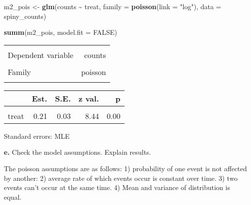 \documentclass[
]{article}
\newenvironment{Shaded}{\begin{snugshade}}{\end{snugshade}}
\newcommand{\AttributeTok}[1]{\textcolor[rgb]{0.13,0.29,0.53}{#1}}
\newcommand{\ConstantTok}[1]{\textcolor[rgb]{0.56,0.35,0.01}{#1}}
\newcommand{\FunctionTok}[1]{\textcolor[rgb]{0.13,0.29,0.53}{\textbf{#1}}}
\newcommand{\NormalTok}[1]{#1}
\newcommand{\OtherTok}[1]{\textcolor[rgb]{0.56,0.35,0.01}{#1}}
\newcommand{\SpecialCharTok}[1]{\textcolor[rgb]{0.81,0.36,0.00}{\textbf{#1}}}
\newcommand{\StringTok}[1]{\textcolor[rgb]{0.31,0.60,0.02}{#1}}
\begin{document}
\begin{Shaded}
\begin{Highlighting}[]
\NormalTok{m2\_pois }\OtherTok{\textless{}{-}} \FunctionTok{glm}\NormalTok{(counts }\SpecialCharTok{\textasciitilde{}}\NormalTok{ treat,}
               \AttributeTok{family =} \FunctionTok{poisson}\NormalTok{(}\AttributeTok{link =} \StringTok{"log"}\NormalTok{),}
               \AttributeTok{data =}\NormalTok{ spiny\_counts)}

\FunctionTok{summ}\NormalTok{(m2\_pois, }\AttributeTok{model.fit =} \ConstantTok{FALSE}\NormalTok{)}
\end{Highlighting}
\end{Shaded}

\begin{table}[!h]
\centering
\begin{tabular}{lr}
\toprule
\cellcolor{gray!10}{Observations} & \cellcolor{gray!10}{252}\\
Dependent variable & counts\\
\cellcolor{gray!10}{Type} & \cellcolor{gray!10}{Generalized linear model}\\
Family & poisson\\
\cellcolor{gray!10}{Link} & \cellcolor{gray!10}{log}\\
\bottomrule
\end{tabular}
\end{table}  \begin{table}[!h]
\centering
\begin{threeparttable}
\begin{tabular}{lrrrr}
\toprule
  & Est. & S.E. & z val. & p\\
\midrule
\cellcolor{gray!10}{(Intercept)} & \cellcolor{gray!10}{3.12} & \cellcolor{gray!10}{0.02} & \cellcolor{gray!10}{171.74} & \cellcolor{gray!10}{0.00}\\
treat & 0.21 & 0.03 & 8.44 & 0.00\\
\bottomrule
\end{tabular}
\begin{tablenotes}
\item Standard errors: MLE
\end{tablenotes}
\end{threeparttable}
\end{table}

\textbf{e.} Check the model assumptions. Explain results.

The poisson assumptions are as follows: 1) probability of one event is
not affected by another: 2) average rate of which events occur is
constant over time. 3) two events can't occur at the same time. 4) Mean
and variance of distribution is equal.
\end{document}
